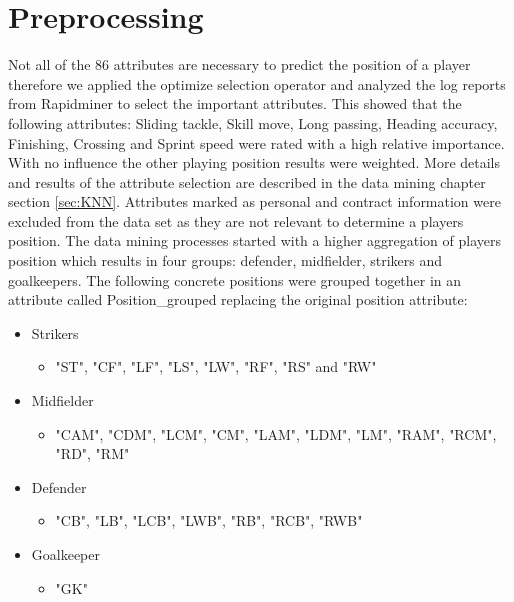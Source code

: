 \section{Preprocessing}
\label{sec:preprocessing}

Not all of the 86 attributes are necessary to predict the position of a player therefore we applied the optimize selection operator and analyzed the log reports from Rapidminer to select the important attributes.
This showed that the following attributes: Sliding tackle, Skill move, Long passing, Heading accuracy, Finishing, Crossing and Sprint speed were rated with a high relative importance. With no influence the other playing position results were weighted. More details and results of the attribute selection are described in the data mining chapter section \ref{sec:KNN}.\newline
Attributes marked as personal and contract information were excluded from the data set as they are not relevant to determine a players position. 
The data mining processes started with a higher aggregation of players position which results in four groups: defender, midfielder, strikers and goalkeepers. The following concrete positions were grouped together in an attribute called Position\_grouped replacing the original position attribute:
\begin{itemize} 
\item Strikers
\begin{itemize}
\item "ST", "CF", "LF", "LS", "LW", "RF", "RS" and "RW"
\end{itemize}
\item Midfielder
\begin{itemize}
\item "CAM", "CDM", "LCM", "CM", "LAM", "LDM", "LM", "RAM", "RCM", "RD", "RM"
\end{itemize}
\item Defender
\begin{itemize} 
\item "CB", "LB", "LCB", "LWB", "RB", "RCB", "RWB"
\end{itemize}
\item Goalkeeper
\begin{itemize}
\item "GK"
\end{itemize}
\end{itemize}

